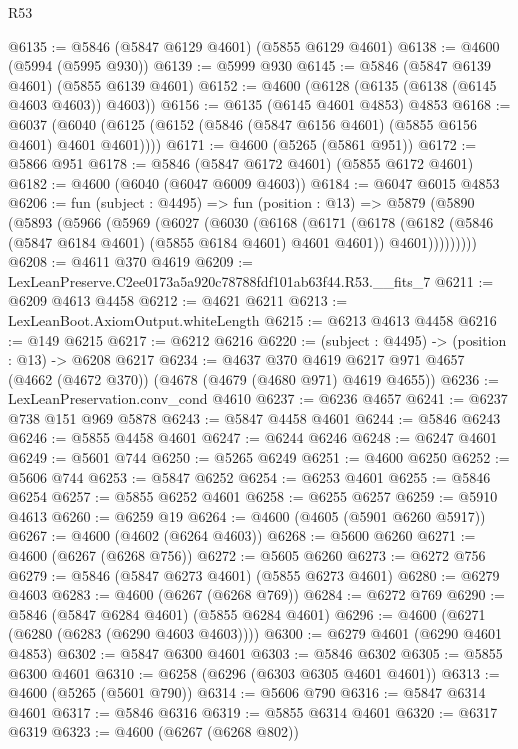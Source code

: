 \begin{lexlean}{R53}
\begin{coremodule}
@6135 := @5846 (@5847 @6129 @4601) (@5855 @6129 @4601)
@6138 := @4600 (@5994 (@5995 @930))
@6139 := @5999 @930
@6145 := @5846 (@5847 @6139 @4601) (@5855 @6139 @4601)
@6152 := @4600 (@6128 (@6135 (@6138 (@6145 @4603 @4603)) @4603))
@6156 := @6135 (@6145 @4601 @4853) @4853
@6168 := @6037 (@6040 (@6125 (@6152 (@5846 (@5847 @6156 @4601) (@5855 @6156 @4601) @4601 @4601))))
@6171 := @4600 (@5265 (@5861 @951))
@6172 := @5866 @951
@6178 := @5846 (@5847 @6172 @4601) (@5855 @6172 @4601)
@6182 := @4600 (@6040 (@6047 @6009 @4603))
@6184 := @6047 @6015 @4853
@6206 := fun (subject : @4495) =>
  fun (position : @13) =>
  @5879
    (@5890
      (@5893
        (@5966
          (@5969
            (@6027
              (@6030
                (@6168
                  (@6171
                    (@6178
                      (@6182 (@5846 (@5847 @6184 @4601) (@5855 @6184 @4601) @4601 @4601))
                      @4601)))))))))
@6208 := @4611 @370 @4619
@6209 := LexLeanPreserve.C2ee0173a5a920c78788fdf101ab63f44.R53.__fits_7
@6211 := @6209 @4613 @4458
@6212 := @4621 @6211
@6213 := LexLeanBoot.AxiomOutput.whiteLength
@6215 := @6213 @4613 @4458
@6216 := @149 @6215
@6217 := @6212 @6216
@6220 := (subject : @4495) -> (position : @13) -> @6208 @6217
@6234 := @4637
    @370
    @4619
    @6217
    @971
    @4657
    (@4662 (@4672 @370))
    (@4678 (@4679 (@4680 @971) @4619 @4655))
@6236 := LexLeanPreservation.conv_cond @4610
@6237 := @6236 @4657
@6241 := @6237 @738 @151 @969 @5878
@6243 := @5847 @4458 @4601
@6244 := @5846 @6243
@6246 := @5855 @4458 @4601
@6247 := @6244 @6246
@6248 := @6247 @4601
@6249 := @5601 @744
@6250 := @5265 @6249
@6251 := @4600 @6250
@6252 := @5606 @744
@6253 := @5847 @6252
@6254 := @6253 @4601
@6255 := @5846 @6254
@6257 := @5855 @6252 @4601
@6258 := @6255 @6257
@6259 := @5910 @4613
@6260 := @6259 @19
@6264 := @4600 (@4605 (@5901 @6260 @5917))
@6267 := @4600 (@4602 (@6264 @4603))
@6268 := @5600 @6260
@6271 := @4600 (@6267 (@6268 @756))
@6272 := @5605 @6260
@6273 := @6272 @756
@6279 := @5846 (@5847 @6273 @4601) (@5855 @6273 @4601)
@6280 := @6279 @4603
@6283 := @4600 (@6267 (@6268 @769))
@6284 := @6272 @769
@6290 := @5846 (@5847 @6284 @4601) (@5855 @6284 @4601)
@6296 := @4600 (@6271 (@6280 (@6283 (@6290 @4603 @4603))))
@6300 := @6279 @4601 (@6290 @4601 @4853)
@6302 := @5847 @6300 @4601
@6303 := @5846 @6302
@6305 := @5855 @6300 @4601
@6310 := @6258 (@6296 (@6303 @6305 @4601 @4601))
@6313 := @4600 (@5265 (@5601 @790))
@6314 := @5606 @790
@6316 := @5847 @6314 @4601
@6317 := @5846 @6316
@6319 := @5855 @6314 @4601
@6320 := @6317 @6319
@6323 := @4600 (@6267 (@6268 @802))

\end{coremodule}
\end{lexlean}
